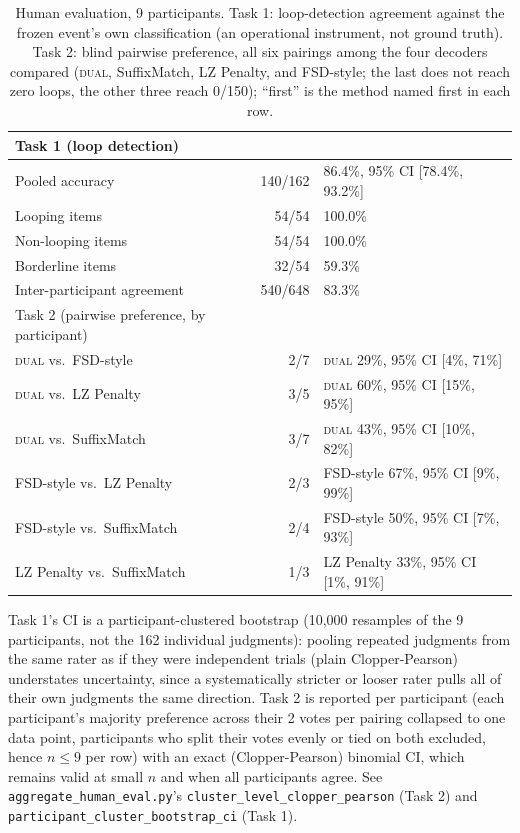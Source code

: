 \documentclass[11pt]{article}
\begin{document}
\begin{table}[ht]
\centering
\caption{Human evaluation, 9 participants. Task 1: loop-detection agreement against the frozen event's own classification (an operational instrument, not ground truth). Task 2: blind pairwise preference, all six pairings among the four decoders compared (\textsc{dual}, SuffixMatch, LZ Penalty, and FSD-style; the last does not reach zero loops, the other three reach 0/150); ``first'' is the method named first in each row.}
\label{tab:humaneval}
\begin{tabular}{@{}lrl@{}}
\toprule
Task 1 (loop detection) & & \\
\midrule
Pooled accuracy & 140/162 & 86.4\%, 95\% CI [78.4\%, 93.2\%] \\
\quad Looping items & 54/54 & 100.0\% \\
\quad Non-looping items & 54/54 & 100.0\% \\
\quad Borderline items & 32/54 & 59.3\% \\
Inter-participant agreement & 540/648 & 83.3\% \\
\midrule
Task 2 (pairwise preference, by participant) & & \\
\midrule
\textsc{dual} vs.\ FSD-style & 2/7 & \textsc{dual} 29\%, 95\% CI [4\%, 71\%] \\
\textsc{dual} vs.\ LZ Penalty & 3/5 & \textsc{dual} 60\%, 95\% CI [15\%, 95\%] \\
\textsc{dual} vs.\ SuffixMatch & 3/7 & \textsc{dual} 43\%, 95\% CI [10\%, 82\%] \\
FSD-style vs.\ LZ Penalty & 2/3 & FSD-style 67\%, 95\% CI [9\%, 99\%] \\
FSD-style vs.\ SuffixMatch & 2/4 & FSD-style 50\%, 95\% CI [7\%, 93\%] \\
LZ Penalty vs.\ SuffixMatch & 1/3 & LZ Penalty 33\%, 95\% CI [1\%, 91\%] \\
\bottomrule
\end{tabular}

\vspace{4pt}
{\footnotesize Task 1's CI is a participant-clustered bootstrap (10,000 resamples of the 9 participants, not the 162 individual judgments): pooling repeated judgments from the same rater as if they were independent trials (plain Clopper-Pearson) understates uncertainty, since a systematically stricter or looser rater pulls all of their own judgments the same direction. Task 2 is reported per participant (each participant's majority preference across their 2 votes per pairing collapsed to one data point, participants who split their votes evenly or tied on both excluded, hence $n\le9$ per row) with an exact (Clopper-Pearson) binomial CI, which remains valid at small $n$ and when all participants agree. See \texttt{aggregate\_\allowbreak{}human\_\allowbreak{}eval.py}'s \texttt{cluster\_\allowbreak{}level\_\allowbreak{}clopper\_\allowbreak{}pearson} (Task 2) and \texttt{participant\_\allowbreak{}cluster\_\allowbreak{}bootstrap\_\allowbreak{}ci} (Task 1).}
\end{table}
\end{document}
